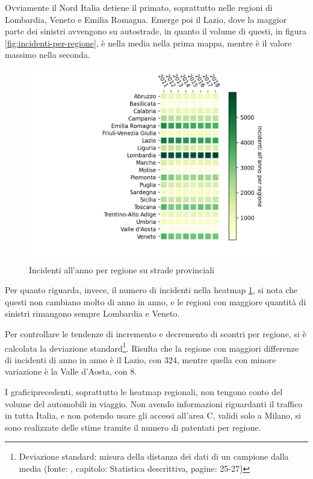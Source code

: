 \documentclass[a4paper,12pt]{report}
\begin{document}
Ovviamente il Nord Italia detiene il primato, 
soprattutto nelle regioni di Lombardia, Veneto e Emilia Romagna. 
Emerge poi il Lazio, dove la maggior parte dei sinistri avvengono su autostrade, 
in quanto il volume di questi, in figura \ref{fig:incidenti-per-regione}, 
è nella media nella prima mappa, mentre è il valore massimo nella seconda. 

\begin{figure}
    \includegraphics[width=\linewidth]{../src/incidenti/incidenti_aci/mappe_regioni/regioni_heatmap.png}
    \caption{Incidenti all'anno per regione su strade provinciali}
    \label{fig:regione-heatmap}
\end{figure}

Per quanto riguarda, invece, il numero di incidenti 
nella heatmap \ref{fig:regione-heatmap}, 
si nota che questi non cambiano molto di anno in anno, e le regioni con maggiore quantità 
di sinistri rimangono sempre Lombardia e Veneto. 

Per controllare le tendenze di incremento e decremento di scontri per regione, 
si è calcolata la deviazione standard\footnote{Deviazione standard: 
misura della distanza dei dati di un campione dalla media 
(fonte: \cite{PROB_E_STATISTICA:1}, 
capitolo: Statistica descrittiva, pagine: 25-27)}. 
Risulta che la regione con maggiori differenze di incidenti di anno in anno 
è il Lazio, con $324$, mentre quella con minore 
variazione è la Valle d'Aosta, con $8$. 

I graficiprecedenti, soprattutto le heatmap regionali, non tengono conto del 
volume del automobili in viaggio. 
Non avendo informazioni riguardanti il traffico in tutta Italia, 
e non potendo usare gli accessi all'area C, validi solo a Milano, si sono realizzate 
delle stime tramite il numero di patentati per regione. 
\end{document}
